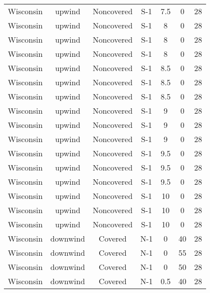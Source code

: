 \documentclass{article}
\begin{document}
\begin{longtable}[c]{ccccccc}
Wisconsin & upwind    & Noncovered & S-1             & 7.5          & 0           & 28  \\
Wisconsin & upwind    & Noncovered & S-1             & 8            & 0           & 28  \\
Wisconsin & upwind    & Noncovered & S-1             & 8            & 0           & 28  \\
Wisconsin & upwind    & Noncovered & S-1             & 8            & 0           & 28  \\
Wisconsin & upwind    & Noncovered & S-1             & 8.5          & 0           & 28  \\
Wisconsin & upwind    & Noncovered & S-1             & 8.5          & 0           & 28  \\
Wisconsin & upwind    & Noncovered & S-1             & 8.5          & 0           & 28  \\
Wisconsin & upwind    & Noncovered & S-1             & 9            & 0           & 28  \\
Wisconsin & upwind    & Noncovered & S-1             & 9            & 0           & 28  \\
Wisconsin & upwind    & Noncovered & S-1             & 9            & 0           & 28  \\
Wisconsin & upwind    & Noncovered & S-1             & 9.5          & 0           & 28  \\
Wisconsin & upwind    & Noncovered & S-1             & 9.5          & 0           & 28  \\
Wisconsin & upwind    & Noncovered & S-1             & 9.5          & 0           & 28  \\
Wisconsin & upwind    & Noncovered & S-1             & 10           & 0           & 28  \\
Wisconsin & upwind    & Noncovered & S-1             & 10           & 0           & 28  \\
Wisconsin & upwind    & Noncovered & S-1             & 10           & 0           & 28  \\
Wisconsin & downwind  & Covered     & N-1             & 0            & 40          & 28  \\
Wisconsin & downwind  & Covered     & N-1             & 0            & 55          & 28  \\
Wisconsin & downwind  & Covered     & N-1             & 0            & 50          & 28  \\
Wisconsin & downwind  & Covered     & N-1             & 0.5          & 40          & 28  \\

\end{longtable}
\end{document}
